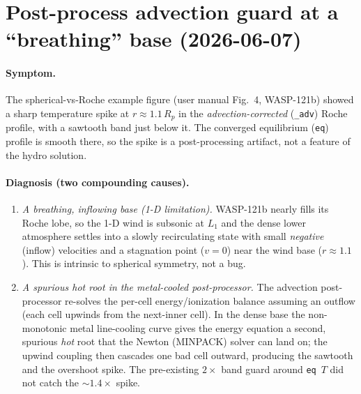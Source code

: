 \documentclass[english,a4paper]{kiseon_memo}
\begin{document}
\section{Post-process advection guard at a ``breathing'' base (2026-06-07)}

\paragraph{Symptom.} The spherical-vs-Roche example figure (user manual
Fig.~4, WASP-121b) showed a sharp temperature spike at $r\approx1.1\,R_p$ in the
\emph{advection-corrected} (\texttt{\_adv}) Roche profile, with a sawtooth band
just below it. The converged equilibrium (\texttt{eq}) profile is smooth there, so
the spike is a post-processing artifact, not a feature of the hydro solution.

\paragraph{Diagnosis (two compounding causes).}
\begin{enumerate}\itemsep2pt
\item \emph{A breathing, inflowing base (1-D limitation).} WASP-121b nearly fills
  its Roche lobe, so the 1-D wind is subsonic at $L_1$ and the dense lower
  atmosphere settles into a slowly recirculating state with small \emph{negative}
  (inflow) velocities and a stagnation point ($v=0$) near the wind base
  ($r\approx1.1$). This is intrinsic to spherical symmetry, not a bug.
\item \emph{A spurious hot root in the metal-cooled post-processor.} The advection
  post-processor re-solves the per-cell energy/ionization balance assuming an
  outflow (each cell upwinds from the next-inner cell). In the dense base the
  non-monotonic metal line-cooling curve gives the energy equation a second,
  spurious \emph{hot} root that the Newton (MINPACK) solver can land on; the upwind
  coupling then cascades one bad cell outward, producing the sawtooth and the
  overshoot spike. The pre-existing $2\times$ band guard around \texttt{eq}~$T$ did
  not catch the $\sim1.4\times$ spike.
\end{enumerate}
\end{document}

